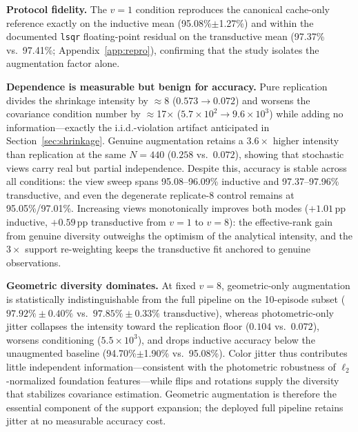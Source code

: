 \textbf{Protocol fidelity.} The $v=1$ condition reproduces the canonical cache-only reference exactly on the inductive mean (95.08\%$\pm$1.27\%) and within the documented \texttt{lsqr} floating-point residual on the transductive mean (97.37\% vs.\ 97.41\%; Appendix~\ref{app:repro}), confirming that the study isolates the augmentation factor alone.

\textbf{Dependence is measurable but benign for accuracy.} Pure replication divides the shrinkage intensity by $\approx$8 ($0.573\to0.072$) and worsens the covariance condition number by $\approx$17$\times$ ($5.7\times10^{2}\to9.6\times10^{3}$) while adding no information---exactly the i.i.d.-violation artifact anticipated in Section~\ref{sec:shrinkage}. Genuine augmentation retains a $3.6\times$ higher intensity than replication at the same $N=440$ ($0.258$ vs.\ $0.072$), showing that stochastic views carry real but partial independence. Despite this, accuracy is stable across all conditions: the view sweep spans 95.08--96.09\% inductive and 97.37--97.96\% transductive, and even the degenerate replicate-8 control remains at 95.05\%/97.01\%. Increasing views monotonically improves both modes ($+1.01$\,pp inductive, $+0.59$\,pp transductive from $v=1$ to $v=8$): the effective-rank gain from genuine diversity outweighs the optimism of the analytical intensity, and the $3\times$ support re-weighting keeps the transductive fit anchored to genuine observations.

\textbf{Geometric diversity dominates.} At fixed $v=8$, geometric-only augmentation is statistically indistinguishable from the full pipeline on the 10-episode subset ($97.92\% \pm 0.40\%$ vs.\ $97.85\% \pm 0.33\%$ transductive), whereas photometric-only jitter collapses the intensity toward the replication floor ($0.104$ vs.\ $0.072$), worsens conditioning ($5.5\times10^{3}$), and drops inductive accuracy below the unaugmented baseline (94.70\%$\pm$1.90\% vs.\ 95.08\%). Color jitter thus contributes little independent information---consistent with the photometric robustness of $\ell_2$-normalized foundation features---while flips and rotations supply the diversity that stabilizes covariance estimation. Geometric augmentation is therefore the essential component of the support expansion; the deployed full pipeline retains jitter at no measurable accuracy cost.

